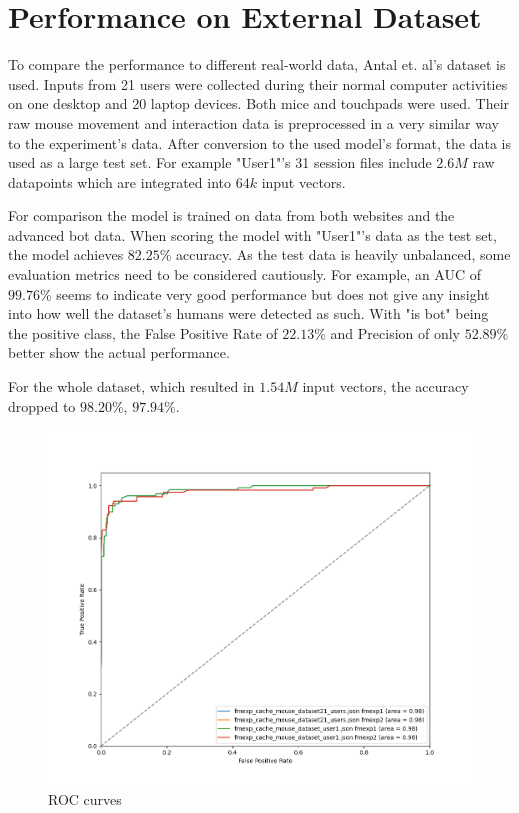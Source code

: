 \documentclass[
    fontsize=12pt,
    headings=small,
    parskip=half,           %
    bibliography=totoc,
    numbers=noenddot,       %
    open=any,               %
    final,                   %
    table
]{scrreprt}
\begin{document}
\section{Performance on External Dataset}

To compare the performance to different real-world data, Antal et. al's dataset \cite{9111596} is used. Inputs from 21 users were collected during their normal computer activities on one desktop and 20 laptop devices. Both mice and touchpads were used. Their raw mouse movement and interaction data is preprocessed in a very similar way to the experiment's data. After conversion to the used model's format, the data is used as a large test set. For example "User1"'s 31 session files include $2.6M$ raw datapoints which are integrated into $64k$ input vectors.

For comparison the model is trained on data from both websites and the advanced bot data. When scoring the model with "User1"'s data as the test set, the model achieves $82.25\%$ accuracy. As the test data is heavily unbalanced, some evaluation metrics need to be considered cautiously. For example, an AUC of $99.76\%$ seems to indicate very good performance but does not give any insight into how well the dataset's humans were detected as such. With "is bot" being the positive class, the False Positive Rate of $22.13\%$ and Precision of only $52.89\%$ better show the actual performance.


For the whole dataset, which resulted in $1.54M$ input vectors, the accuracy dropped to $98.20\%$, $97.94\%$.

\begin{figure}[H]
    \includegraphics[width=\textwidth]{figures/roc_both_datasets_both_instances.png}
    \caption{ROC curves}
    \label{fig:roc_both_datasets_both_instances}
\end{figure}
\end{document}
